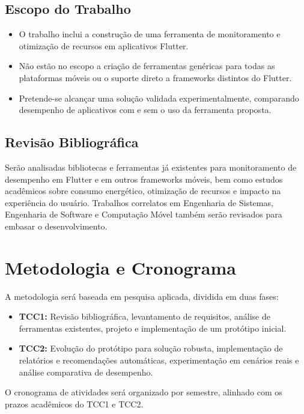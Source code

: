 \documentclass[12pt,a4paper]{article}
\begin{document}
\subsection{Escopo do Trabalho}
\begin{itemize}
    \item O trabalho inclui a construção de uma ferramenta de monitoramento e otimização de recursos em aplicativos Flutter.
    \item Não estão no escopo a criação de ferramentas genéricas para todas as plataformas móveis ou o suporte direto a frameworks distintos do Flutter.
    \item Pretende-se alcançar uma solução validada experimentalmente, comparando desempenho de aplicativos com e sem o uso da ferramenta proposta.
\end{itemize}

\subsection{Revisão Bibliográfica}
Serão analisadas bibliotecas e ferramentas já existentes para monitoramento de desempenho em Flutter e em outros frameworks móveis, bem como estudos acadêmicos sobre consumo energético, otimização de recursos e impacto na experiência do usuário. Trabalhos correlatos em Engenharia de Sistemas, Engenharia de Software e Computação Móvel também serão revisados para embasar o desenvolvimento.

\section{Metodologia e Cronograma}

A metodologia será baseada em pesquisa aplicada, dividida em duas fases:

\begin{itemize}
    \item \textbf{TCC1:} Revisão bibliográfica, levantamento de requisitos, análise de ferramentas existentes, projeto e implementação de um protótipo inicial.
    \item \textbf{TCC2:} Evolução do protótipo para solução robusta, implementação de relatórios e recomendações automáticas, experimentação em cenários reais e análise comparativa de desempenho.
\end{itemize}

O cronograma de atividades será organizado por semestre, alinhado com os prazos acadêmicos do TCC1 e TCC2.
\end{document}
